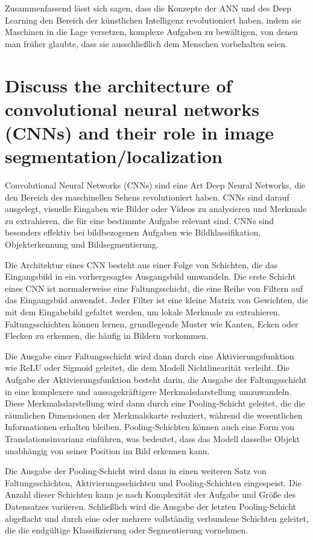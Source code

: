         Zusammenfassend lässt sich sagen, dass die Konzepte der ANN und des Deep Learning den Bereich der künstlichen
        Intelligenz revolutioniert haben, indem sie Maschinen in die Lage versetzen, komplexe Aufgaben zu bewältigen,
        von denen man früher glaubte, dass sie ausschließlich dem Menschen vorbehalten seien.

    \section{Discuss the architecture of convolutional neural networks (CNNs) and their role in image segmentation/localization}

        Convolutional Neural Networks (CNNs) sind eine Art Deep Neural Networks, die den Bereich des maschinellen
        Sehens revolutioniert haben. CNNs sind darauf ausgelegt, visuelle Eingaben wie Bilder oder Videos zu
        analysieren und Merkmale zu extrahieren, die für eine bestimmte Aufgabe relevant sind. CNNs sind besonders
        effektiv bei bildbezogenen Aufgaben wie Bildklassifikation, Objekterkennung und Bildsegmentierung.

        Die Architektur eines CNN besteht aus einer Folge von Schichten, die das Eingangsbild in ein vorhergesagtes
        Ausgangsbild umwandeln. Die erste Schicht eines CNN ist normalerweise eine Faltungsschicht, die eine Reihe
        von Filtern auf das Eingangsbild anwendet. Jeder Filter ist eine kleine Matrix von Gewichten, die mit dem
        Eingabebild gefaltet werden, um lokale Merkmale zu extrahieren. Faltungsschichten können lernen,
        grundlegende Muster wie Kanten, Ecken oder Flecken zu erkennen, die häufig in Bildern vorkommen.
        
        Die Ausgabe einer Faltungsschicht wird dann durch eine Aktivierungsfunktion wie ReLU oder Sigmoid geleitet,
        die dem Modell Nichtlinearität verleiht. Die Aufgabe der Aktivierungsfunktion besteht darin, die Ausgabe
        der Faltungsschicht in eine komplexere und aussagekräftigere Merkmalsdarstellung umzuwandeln. Diese
        Merkmalsdarstellung wird dann durch eine Pooling-Schicht geleitet, die die räumlichen Dimensionen der
        Merkmalskarte reduziert, während die wesentlichen Informationen erhalten bleiben. Pooling-Schichten können
        auch eine Form von Translationsinvarianz einführen, was bedeutet, dass das Modell dasselbe Objekt unabhängig
        von seiner Position im Bild erkennen kann.

        Die Ausgabe der Pooling-Schicht wird dann in einen weiteren Satz von Faltungsschichten, Aktivierungsschichten
        und Pooling-Schichten eingespeist. Die Anzahl dieser Schichten kann je nach Komplexität der Aufgabe und Größe
        des Datensatzes variieren. Schließlich wird die Ausgabe der letzten Pooling-Schicht abgeflacht und durch eine
        oder mehrere vollständig verbundene Schichten geleitet, die die endgültige Klassifizierung oder Segmentierung
        vornehmen.

